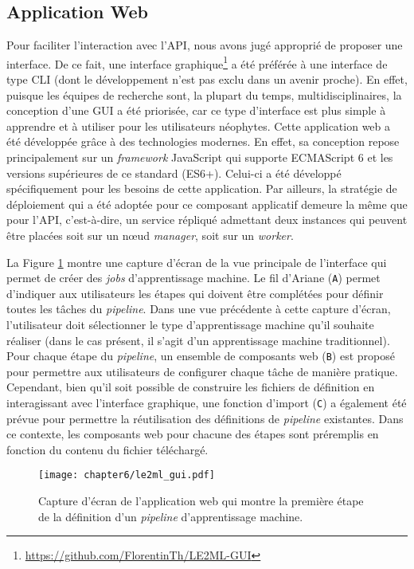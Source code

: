 \subsection{Application Web}

Pour faciliter l'interaction avec l'\acs{API}, nous avons jugé approprié de proposer une interface. De ce fait, une interface graphique\footnote{\url{https://github.com/FlorentinTh/LE2ML-GUI}} a été préférée à une interface de type \acs{CLI} (dont le développement n'est pas exclu dans un avenir proche). En effet, puisque les équipes de recherche sont, la plupart du temps, multidisciplinaires, la conception d'une \acs{GUI} a été priorisée, car ce type d'interface est plus simple à apprendre et à utiliser pour les utilisateurs néophytes. Cette application web a été développée grâce à des technologies modernes. En effet, sa conception repose principalement sur un \textit{framework} JavaScript qui supporte ECMAScript 6 et les versions supérieures de ce standard (ES6+). Celui-ci a été développé spécifiquement pour les besoins de cette application. Par ailleurs, la stratégie de déploiement qui a été adoptée pour ce composant applicatif demeure la même que pour l'\acs{API}, c'est-à-dire, un service répliqué admettant deux instances qui peuvent être placées soit sur un n\oe{}ud \textit{manager}, soit sur un \textit{worker}.

La Figure \ref{fig:le2ml_gui} montre une capture d'écran de la vue principale de l'interface qui permet de créer des \textit{jobs} d'apprentissage machine. Le fil d'Ariane (\texttt{A}) permet d'indiquer aux utilisateurs les étapes qui doivent être complétées pour définir toutes les tâches du \textit{pipeline}. Dans une vue précédente à cette capture d'écran, l'utilisateur doit sélectionner le type d'apprentissage machine qu'il souhaite réaliser (dans le cas présent, il s'agit d'un apprentissage machine traditionnel). Pour chaque étape du \textit{pipeline}, un ensemble de composants web (\texttt{B}) est proposé pour permettre aux utilisateurs de configurer chaque tâche de manière pratique. Cependant, bien qu'il soit possible de construire les fichiers de définition en interagissant avec l'interface graphique, une fonction d'import (\texttt{C}) a également été prévue pour permettre la réutilisation des définitions de \textit{pipeline} existantes. Dans ce contexte, les composants web pour chacune des étapes sont préremplis en fonction du contenu du fichier téléchargé.

\begin{figure}[H]
	\centering
	\texttt{[image: chapter6/le2ml\_gui.pdf]}
        \caption{Capture d'écran de l'application web qui montre la première étape de la définition d'un \textit{pipeline} d'apprentissage machine.}
	\label{fig:le2ml_gui}
\end{figure}

